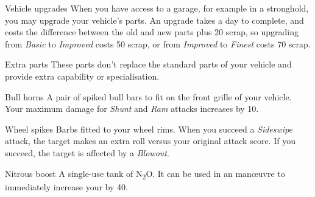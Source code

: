 \begin{abstractsection}{Vehicle upgrades}
  When you have access to a garage, for example in a stronghold, you may upgrade your vehicle's parts. An upgrade takes a day to complete, and costs the difference between the old and new parts plus 20 scrap, so upgrading from \emph{Basic} to \emph{Improved} costs 50 scrap, or from \emph{Improved} to \emph{Finest} costs 70 scrap.
\end{abstractsection}

\begin{abstractsection}{Extra parts}
These parts don't replace the standard parts of your vehicle and provide extra capability or specialisation.

\begin{describe}{Bull horns}
  A pair of spiked bull bars to fit on the front grille of your vehicle. Your maximum damage for \emph{Shunt} and \emph{Ram} attacks increases by 10.
\end{describe}

\begin{describe}{Wheel spikes}
  Barbs fitted to your wheel rims. When you succeed a \emph{Sideswipe} attack, the target makes an extra  roll versus your original attack score. If you succeed, the target is affected by a \emph{Blowout}.
\end{describe}

\begin{describe}{Nitrous boost}
  A single-use tank of N\textsubscript{2}O. It can be used in an  man\oe{}uvre to immediately increase your  by 40.
\end{describe}

\end{abstractsection}

